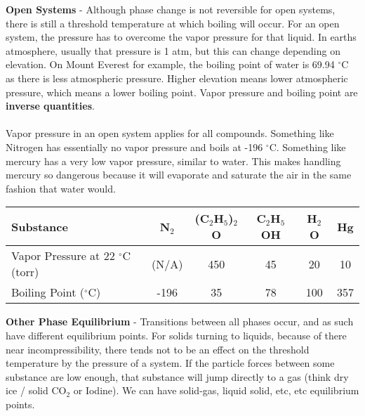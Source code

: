 \documentclass{article}
\begin{document}
\noindent\textbf{Open Systems} - Although phase	change is not reversible for open systems, there is still a threshold temperature at which boiling will occur. For an open system, the pressure has to overcome the vapor pressure for that liquid. In earths atmosphere, usually that pressure is 1 atm, but this can change depending on elevation. On Mount Everest for example, the boiling point of water is 69.94 $^{\circ} $C as there is less atmospheric pressure. Higher elevation means lower atmospheric pressure, which means a lower boiling point. Vapor pressure and boiling point are \textbf{inverse quantities}.\\
\\
Vapor pressure in an open system applies for all compounds. Something like Nitrogen has essentially no vapor pressure and boils at -196 $^{\circ}$C. Something like mercury has a very low vapor pressure, similar to water. This makes handling mercury so dangerous because it will evaporate and saturate the air in the same fashion that water would.
	
	\vspace{10pt}
	\renewcommand{\Tstrut}{\rule{0pt}{3.3ex}}         %
	\renewcommand{\Bstrut}{\rule[-2ex]{0pt}{0pt}}   %
	\renewcommand{\TBstrut}{\Tstrut\Bstrut}    
	\newcommand{\TTstrut}{\rule{0pt}{1ex}}         %
	\newcommand{\BBstrut}{\rule[1ex]{0pt}{0pt}}   %
	\newcommand{\TTBBstrut}{\Tstrut\Bstrut}
		\hspace{-17pt}\begin{tabular}{|l|@{\qquad\quad}c@{\qquad\quad}c@{\qquad\quad}c@{\qquad\quad}c@{\qquad\quad}c@{\qquad\quad}|}
		\hline 
		\textbf{Substance} & N$_2$ & (C$_2$H$_5$)$_2$O & C$_2$H$_5$OH & H$_2$O & Hg \TBstrut\\
		\hline
		Vapor Pressure at 22 $^{\circ}$C (torr) & (N/A) & 450 &45 &20 &10 \TTBBstrut\\
		Boiling Point ($^{\circ}$C) & -196 & 35 &78 &100 & 357\TTBBstrut \\
	
		\hline
	\end{tabular}
	
	\vspace{15	pt}
	\noindent\textbf{Other Phase Equilibrium} - Transitions between all phases occur, and as such have different equilibrium points. For solids turning to liquids, because of there near incompressibility, there tends not to be an effect on the threshold temperature by the pressure of a system. If the particle forces between some substance are low enough, that substance will jump directly to a gas (think dry ice / solid CO$_2$ or Iodine). We can have solid-gas, liquid solid, etc, etc equilibrium points.
	
\end{document}
